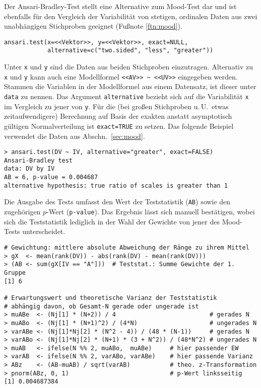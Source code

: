 Der Ansari-Bradley-Test stellt eine Alternative zum Mood-Test dar und ist ebenfalls für den Vergleich der Variabilität von stetigen, ordinalen Daten aus zwei unabhängigen Stichproben geeignet (Fußnote \ref{ftn:mood}).
\begin{lstlisting}
ansari.test(x=<<Vektor>>, y=<<Vektor>>, exact=NULL,
            alternative=c("two.sided", "less", "greater"))
\end{lstlisting}

Unter \lstinline!x! und \lstinline!y! sind die Daten aus beiden Stichproben einzutragen. Alternativ zu \lstinline!x! und \lstinline!y! kann auch eine Modellformel \lstinline!<<AV>> ~ <<UV>>! eingegeben werden. Stammen die Variablen in der Modellformel aus einem Datensatz, ist dieser unter \lstinline!data! zu nennen. Das Argument \lstinline!alternative! bezieht sich auf die Variabilität \lstinline!x! im Vergleich zu jener von \lstinline!y!. Für die (bei großen Stichproben u.\,U.\ etwas zeitaufwendigere) Berechnung auf Basis der exakten anstatt asymptotisch gültigen Normalverteilung ist \lstinline!exact=TRUE! zu setzen. Das folgende Beispiel verwendet die Daten aus Abschn.\ \ref{sec:mood}.
\begin{lstlisting}
> ansari.test(DV ~ IV, alternative="greater", exact=FALSE)
Ansari-Bradley test
data: DV by IV
AB = 6, p-value = 0.004687
alternative hypothesis: true ratio of scales is greater than 1
\end{lstlisting}

Die Ausgabe des Tests umfasst den Wert der Teststatistik (\lstinline!AB!) sowie den zugehörigen $p$-Wert (\lstinline!p-value!). Das Ergebnis lässt sich manuell bestätigen, wobei sich die Teststatistik lediglich in der Wahl der Gewichte von jener des Mood-Tests unterscheidet.
\begin{lstlisting}
# Gewichtung: mittlere absolute Abweichung der Ränge zu ihrem Mittel
> gX  <- mean(rank(DV)) - abs(rank(DV) - mean(rank(DV)))
> (AB <- sum(gX[IV == "A"]))  # Teststat.: Summe Gewichte der 1. Gruppe
[1] 6

# Erwartungswert und theoretische Varianz der Teststatistik
# abhängig davon, ob Gesamt-N gerade oder ungerade ist
> muABe  <- (Nj[1] * (N+2)) / 4                          # gerades N
> muABo  <- (Nj[1] * (N+1)^2) / (4*N)                    # ungerades N
> varABe <- (Nj[1]*Nj[2] * (N^2 - 4)) / (48 * (N-1))     # gerades N
> varABo <- (Nj[1]*Nj[2] * (N+1) * (3 + N^2)) / (48*N^2) # ungerades N
> muAB   <- ifelse(N %% 2, muABo,  muABe)     # hier passender EW
> varAB  <- ifelse(N %% 2, varABo, varABe)    # hier passende Varianz
> ABz    <- (AB-muAB) / sqrt(varAB)           # theo. z-Transformation
> pnorm(ABz, 0, 1)                            # p-Wert linksseitig
[1] 0.004687384
\end{lstlisting}


